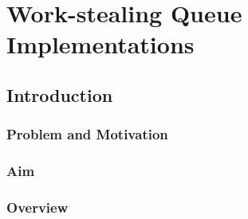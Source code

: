 
\part{Work-stealing Queue Implementations}
\label{part:queues}

\chapter{Introduction}
\label{chap:queues-introduction}


\section{Problem and Motivation}
\label{sec:queues-intro-problem-and-motivation}


\section{Aim}
\label{sec:queues-intro-aim}


\section{Overview}
\label{sec:queues-intro-overview}


